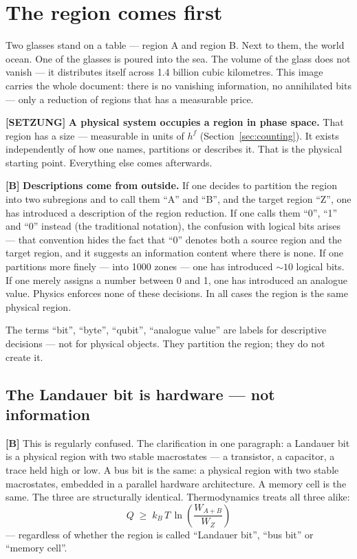 \bigskip

\section{The region comes first}

Two glasses stand on a table --- region A and region B. Next to them, the world
ocean. One of the glasses is poured into the sea. The volume of the glass does not
vanish --- it distributes itself across 1.4 billion cubic kilometres. This image
carries the whole document: there is no vanishing information, no annihilated
bits --- only a reduction of regions that has a measurable price.

\textbf{[SETZUNG]} \textbf{A physical system occupies a region in phase space.} That region has a
size --- measurable in units of $h^f$ (Section~\ref{sec:counting}). It exists
independently of how one names, partitions or describes it. That is the physical
starting point. Everything else comes afterwards.

\textbf{[B]} \textbf{Descriptions come from outside.} If one decides to partition the
region into two subregions and to call them “A” and “B”, and the target region
“Z”, one has introduced a description of the region reduction. If one calls them
“0”, “1” and “0” instead (the traditional notation), the confusion with logical
bits arises --- that convention hides the fact that “0” denotes both a source
region and the target region, and it suggests an information content where there
is none. If one partitions more finely --- into 1000 zones --- one has introduced
${\sim}10$ logical bits. If one merely assigns a number between 0 and 1, one has
introduced an analogue value. Physics enforces none of these decisions. In all
cases the region is the same physical region.

The terms “bit”, “byte”, “qubit”, “analogue value” are labels for descriptive
decisions --- not for physical objects. They partition the region; they do not
create it.

\subsection{The Landauer bit is hardware --- not information}

\textbf{[B]} This is regularly confused. The clarification in one paragraph: a Landauer bit
is a physical region with two stable macrostates --- a transistor, a capacitor, a
trace held high or low. A bus bit is the same: a physical region with two stable
macrostates, embedded in a parallel hardware architecture. A memory cell is the
same. The three are structurally identical. Thermodynamics treats all three
alike:
\[
  Q \;\ge\; k_B\,T\,\ln\!\left(\frac{W_{A+B}}{W_Z}\right)
\]
--- regardless of whether the region is called “Landauer bit”, “bus bit” or
“memory cell”.

